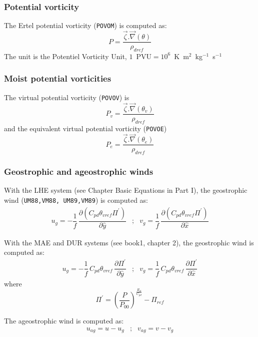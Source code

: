 \subsubsection{Potential vorticity}
The Ertel potential vorticity  ({\tt POVOM}) is computed as:
\begin{equation}
P = \dfrac{\vec\zeta .\vec\nabla(\theta)}{\rho_{dref}} 
\end{equation}
The unit is the Potentiel Vorticity Unit, 
$1$~PVU$=10^6$~K~m$^2$~kg$^{-1}$~s$^{-1}$


\subsubsection{Moist potential vorticities}
The virtual potential vorticity ({\tt POVOV}) is
\begin{equation}
P_v = \dfrac{\vec\zeta .\vec\nabla(\theta_v)}{\rho_{dref}} 
\end{equation}
and the equivalent virtual potential vorticity ({\tt POVOE}) 
\begin{equation}
P_e = \dfrac{\vec\zeta .\vec\nabla(\theta_e)}{\rho_{dref}} 
\end{equation}


\subsubsection{Geostrophic and ageostrophic winds}
With the LHE system (see Chapter Basic Equations in Part I), the geostrophic wind 
({\tt UM88,VM88, UM89,VM89}) is computed as:
\begin{eqnarray}
u_g= - \dfrac{1}{f}\,\dfrac{\partial{(C_{pd}\theta_{vref}\Pi^{'})}}{\partial\hat{y}} &;&
v_g=   \dfrac{1}{f}\, \dfrac{\partial{(C_{pd}\theta_{vref}\Pi^{'})}}{\partial\hat{x}} 
\end{eqnarray}

\noindent With the MAE and DUR systems (see book1, chapter 2), 
the geostrophic wind is computed as:
\begin{eqnarray}
u_g= - \dfrac{1}{f} \, C_{pd}\theta_{vref} \,
       \dfrac{\partial\Pi^{'}}{\partial\hat{y}} &;&
v_g=   \dfrac{1}{f} \, C_{pd}\theta_{vref} \,
       \dfrac{\partial\Pi^{'}}{\partial\hat{x}}
\end{eqnarray}
where $$
\Pi^{'} = \left(\dfrac{P}{P_{00}}\right)^{\frac{R_d}{C_{pd} }} - \Pi_{ref} $$

\noindent The ageostrophic wind is computed as: 
\begin{eqnarray}
u_{ag} = u - u_g &;& v_{ag} = v - v_g \nonumber
\end{eqnarray}
%
